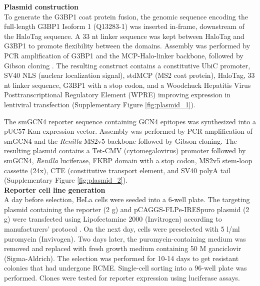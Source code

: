 \textbf{Plasmid construction} \\
To generate the G3BP1 coat protein fusion, the genomic sequence encoding the full-length G3BP1 Isoform 1 (Q13283-1) was inserted in-frame, downstream of the HaloTag sequence.
A 33 nt linker sequence was kept between HaloTag and G3BP1 to promote flexibility between the domains.
Assembly was performed by PCR amplification of G3BP1 and the MCP-Halo-linker backbone, followed by Gibson cloning \cite{gibson_enzymatic_2009}.
The resulting construct contains a constitutive UbiC promoter, SV40 NLS (nuclear localization signal), stdMCP (MS2 coat protein), HaloTag, 33 nt linker sequence, G3BP1 with a stop codon, and a  Woodchuck Hepatitis Virus Posttranscriptional Regulatory Element (WPRE) improving expression in lentiviral transfection (Supplementary Figure \ref{fig:plasmid_1}).

The smGCN4 reporter sequence containing GCN4 epitopes was synthesized into a pUC57-Kan expression vector.
Assembly was performed by PCR amplification of smGCN4 and the \textit{Renilla}-MS2v5 backbone followed by Gibson cloning.
The resulting plasmid contains a Tet-CMV (cytomegalovirus) promoter followed by smGCN4, \textit{Renilla} luciferase, FKBP domain with a stop codon, MS2v5 stem-loop cassette (24x), CTE (constitutive transport element, and SV40 polyA tail (Supplementary Figure \ref{fig:plasmid_2}).
\\

\textbf{Reporter cell line generation} \\
A day before selection, HeLa cells were seeded into a 6-well plate.
The targeting plasmid containing the reporter (2 \textmu g) and pCAGGS-FLPe-IRESpuro plasmid (2 \textmu g) were transfected using Lipofectamine 2000 (Invitrogen) according to manufacturers’ protocol \cite{beard_efficient_2006}.
On the next day, cells were preselected with 5 \textmu l/ml puromycin (Invivogen). Two days later, the puromycin-containing medium was removed and replaced with fresh growth medium containing 50 \textmu M ganciclovir (Sigma-Aldrich).
The selection was performed for 10-14 days to get resistant colonies that had undergone RCME.
Single-cell sorting into a 96-well plate was performed.
Clones were tested for reporter expression using luciferase assays.
\\

